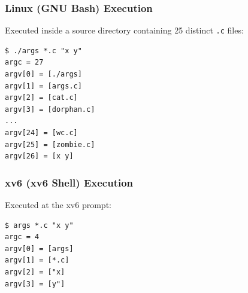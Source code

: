 \documentclass[12pt,a4paper]{article}
\begin{document}
\subsubsection{Linux (GNU Bash) Execution}
Executed inside a source directory containing 25 distinct \texttt{.c} files:
\begin{lstlisting}[style=consolestyle, caption={Execution of args *.c "x y" under GNU Bash}]
$ ./args *.c "x y"
argc = 27
argv[0] = [./args]
argv[1] = [args.c]
argv[2] = [cat.c]
argv[3] = [dorphan.c]
...
argv[24] = [wc.c]
argv[25] = [zombie.c]
argv[26] = [x y]
\end{lstlisting}

\subsubsection{xv6 (xv6 Shell) Execution}
Executed at the xv6 prompt:
\begin{lstlisting}[style=consolestyle, caption={Execution of args *.c "x y" under xv6 sh}]
$ args *.c "x y"
argc = 4
argv[0] = [args]
argv[1] = [*.c]
argv[2] = ["x]
argv[3] = [y"]
\end{lstlisting}
\end{document}
